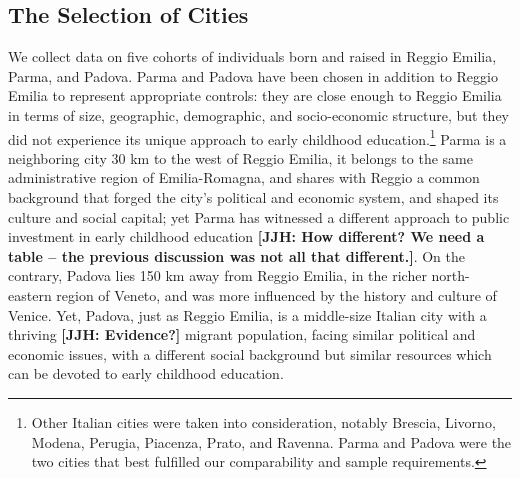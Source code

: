 \subsection{The Selection of Cities}

We collect data on five cohorts of individuals born and raised in Reggio Emilia, Parma, and Padova. Parma and Padova have been chosen in addition to Reggio Emilia to represent appropriate controls: they are close enough to Reggio Emilia in terms of size, geographic, demographic, and socio-economic structure, but they did not experience its unique approach to early childhood education.\footnote{Other Italian cities were taken into consideration, notably Brescia, Livorno, Modena, Perugia, Piacenza, Prato, and Ravenna. Parma and Padova were the two cities that best fulfilled our comparability and sample requirements.} Parma is a neighboring city 30 km to the west of Reggio Emilia, it belongs to the same administrative region of Emilia-Romagna, and shares with Reggio a common background that forged the city's political and economic system, and shaped its culture and social capital; yet Parma has witnessed a different approach to public investment in early childhood education \textbf{[JJH: How different? We need a table -- the previous discussion was not all that different.]}. On the contrary, Padova lies 150 km away from Reggio Emilia, in the richer north-eastern region of Veneto, and was more influenced by the history and culture of Venice. Yet, Padova, just as Reggio Emilia, is a middle-size Italian city with a thriving \textbf{[JJH: Evidence?]} migrant population, facing similar political and economic issues, with a different social background but similar resources which can be devoted to early childhood education.

